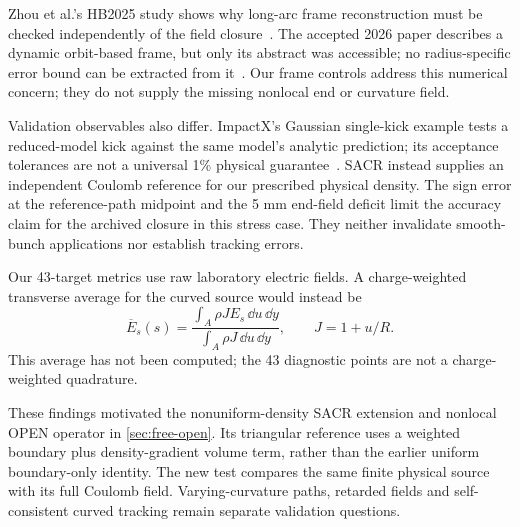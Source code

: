 Zhou et al.'s HB2025 study shows why long-arc frame reconstruction must be
checked independently of the field closure~\cite{zhou2025}.
The accepted 2026 paper describes a dynamic orbit-based frame, but only its
abstract was accessible; no radius-specific error bound can be extracted
from it~\cite{zhou2026}. Our frame controls address this numerical concern;
they do not supply the missing nonlocal end or curvature field.

Validation observables also differ. ImpactX's Gaussian single-kick example
tests a reduced-model kick against the same model's analytic prediction;
its acceptance tolerances are not a universal 1\% physical guarantee~\cite{impactx}.
SACR instead supplies an independent Coulomb reference for our prescribed
physical density. The sign error at the reference-path midpoint and the
5 mm end-field deficit limit the accuracy claim for the archived closure in
this stress case. They neither invalidate smooth-bunch applications nor
establish tracking errors.

Our 43-target metrics use raw laboratory electric fields. A charge-weighted
transverse average for the curved source would instead be
\begin{equation}
 \overline E_s(s)=\frac{\int_A\rho J E_s\,\dd u\,\dd y}
 {\int_A\rho J\,\dd u\,\dd y},\qquad J=1+u/R.
 \label{eq:literature-average}
\end{equation}
This average has not been computed; the 43 diagnostic points are not a
charge-weighted quadrature.

These findings motivated the nonuniform-density SACR extension and nonlocal
OPEN operator in \cref{sec:free-open}. Its triangular reference uses a weighted
boundary plus density-gradient volume term, rather than the earlier uniform
boundary-only identity. The new test compares the same finite physical source
with its full Coulomb field. Varying-curvature paths, retarded fields and
self-consistent curved tracking remain separate validation questions.
